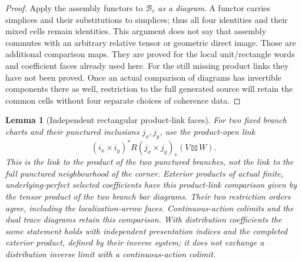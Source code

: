 \documentclass[11pt]{article}
\newtheorem{lemma}[proposition]{Lemma}
\theoremstyle{definition}
\theoremstyle{remark}
\begin{document}
\begin{proof}
Apply the assembly functors to $\mathcal B_r$ \emph{as a diagram}.
A functor carries simplices and their substitutions to simplices;
thus all four identities and their mixed cells remain identities.
This argument does not say that assembly commutes with an arbitrary
relative tensor or geometric direct image.  Those are additional
comparison maps.  They are proved for the local unit/rectangle
words and coefficient faces already used here.  For the still
missing product links they have not been proved.  Once an actual
comparison of diagrams has invertible components there as well,
restriction to the full generated source will retain the common
cells without four separate choices of coherence data.
\end{proof}


\begin{lemma}[Independent rectangular product-link faces]
\label{lem:root-rectangular-link-faces}
For two fixed branch charts and their punctured inclusions
$j_x,j_y$, use the product-open link
\[
 (i_x\times i_y)^*R(j_x\times j_y)_*(V\boxtimes W).
\]
This is the link to the product of the two punctured branches, not
the link to the full punctured neighbourhood of the corner.
Exterior products of actual finite, underlying-perfect selected
coefficients have this product-link comparison given by the tensor
product of the two branch bar diagrams.  Their two restriction orders agree, including the
localization-arrow faces.  Continuous-action colimits and the
dual trace diagrams retain this comparison.  With distribution
coefficients the same statement holds with independent presentation
indices and the completed exterior product, defined by their
inverse system; it does not exchange a distribution inverse limit
with a continuous-action colimit.
\end{lemma}
\end{document}
